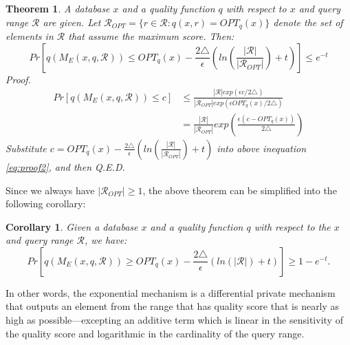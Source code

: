 \documentclass[a4paper, 11pt]{article} %
\newtheorem{theorem}{Theorem}
\newtheorem{corollary}{Corollary}[theorem]
\begin{document}
\begin{theorem}
A database $x$ and a quality function $q$ with respect to $x$ and query range $\mathcal{R}$ are given. Let $\mathcal{R}_{OPT} =\{r \in \mathcal{R}: q(x, r) = OPT_q(x) \}$ denote the set of elements in $\mathcal{R}$ that assume the maximum score. Then:
\begin{equation}
Pr \left[q(M_E(x, q, \mathcal{R}))
\leq OPT_q(x) - \frac{2\triangle}{\epsilon}
\left(
ln \left( \frac{|\mathcal{R}|}{|\mathcal{R}_{OPT}|} \right) + t
\right) \right]
 \leq e^{-t}
\end{equation}
\textit{Proof. }
\begin{align}  \label{eq:proof2}
Pr[q(M_E(x, q, \mathcal{R})) \leq c]
& \leq \frac{
|\mathcal{R}| exp(\epsilon c / 2 \triangle)
}{
|\mathcal{R}_{OPT}| exp(\epsilon OPT_q(x) / 2 \triangle)
} \\
&= \frac{|\mathcal{R}| }{ | \mathcal{R}_{OPT} | }
exp(
\frac{\epsilon ( c - OPT_q(x)  ) }{2 \triangle}
)
\end{align}
Substitute $c = OPT_q(x) - \frac{2\triangle}{\epsilon}
\left(
ln \left( \frac{|\mathcal{R}|}{|\mathcal{R}_{OPT}|} \right) + t
\right)
$ into above inequation \ref{eq:proof2}, and then Q.E.D.
\end{theorem}
Since we always have $|\mathcal{R}_{OPT}| \geq 1$, the above theorem can be simplified into the following corollary:
\begin{corollary}
Given a database $x$ and a quality function $q$ with respect to the $x$ and query range $\mathcal{R}$, we have:
\begin{equation}
Pr[q(M_E(x, q, \mathcal{R}))  \geq
OPT_q(x) - \frac{2 \triangle}{\epsilon} (ln(| \mathcal{R}|) + t)]
\geq 1-e^{-t}.
\end{equation}
\end{corollary}
In other words, the exponential mechanism is a differential private mechanism that outputs an element from the range that has quality score that is nearly as high as possible---excepting an additive term which is linear in the sensitivity of the quality score and logarithmic in the cardinality of the query range.
\end{document}
